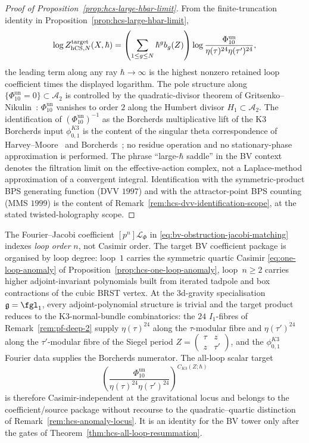 \begin{proof}[Proof of Proposition~\ref{prop:hcs-large-hbar-limit}]
From the finite-truncation identity in
Proposition~\ref{prop:hcs-large-hbar-limit},
\[
\log Z_{\mathrm{hCS},N}^{\mathrm{target}}(X,\hbar)
=
\left(\sum_{1\leq g\leq N}\hbar^g b_g(Z)\right)
\log\frac{\Phi_{10}^{\mathrm{un}}}
{\eta(\tau)^{24}\eta(\tau')^{24}},
\]
the leading term along any ray \(\hbar\to\infty\) is the highest
nonzero retained loop coefficient times the displayed logarithm. The
pole structure along $\{\Phi_{10}^{\mathrm{un}}=0\}\subset
\mathcal{A}_2$ is controlled by the quadratic-divisor theorem of
Gritsenko--Nikulin~\cite{GritsenkoNikulin1998}:
$\Phi_{10}^{\mathrm{un}}$ vanishes to order $2$ along the Humbert divisor
$H_{1}\subset\mathcal A_{2}$.
The identification of $(\Phi_{10}^{\mathrm{un}})^{-1}$ as the Borcherds multiplicative
lift of the K3 Borcherds input \(\phi_{0,1}^{K3}\) is
the content of the singular theta correspondence of
Harvey--Moore~\cite{HarveyMoore1996} and
Borcherds~\cite{Borcherds1998}; no residue operation and no
stationary-phase approximation is performed. The phrase
``large-$\hbar$ saddle'' in the BV context denotes the filtration
limit on the effective-action complex, not a Laplace-method
approximation of a convergent integral. Identification with the
symmetric-product BPS generating function (DVV $1997$) and with the
attractor-point BPS counting (MMS $1999$) is the content of
Remark~\ref{rem:hcs-dvv-identification-scope}, at the stated
twisted-holography scope.
\end{proof}

\begin{remark}
\label{rem:hcs-loop-vs-casimir}
The Fourier--Jacobi coefficient \([p^n]\mathcal L_{\Phi}\) in
\eqref{eq:bv-obstruction-jacobi-matching} indexes
\emph{loop order} $n$, not Casimir order. The target BV coefficient
package is organised by loop degree: loop~$1$ carries the symmetric
quartic Casimir \eqref{eq:one-loop-anomaly} of
Proposition~\ref{prop:hcs-one-loop-anomaly}, loop~$n \geq 2$ carries
higher adjoint-invariant polynomials built from iterated tadpole and
box contractions of the cubic BRST vertex. At the 3d-gravity specialisation
$\fg = \fgl_{1}$, every adjoint-polynomial structure is trivial and
the target product reduces to the K3-normal-bundle combinatorics: the
$24$ $I_{1}$-fibres of Remark~\ref{rem:pf-deep-2} supply
$\eta(\tau)^{24}$ along the $\tau$-modular fibre and $\eta(\tau')^{24}$
along the $\tau'$-modular fibre of the Siegel period
$Z=\begin{pmatrix}\tau&z\\z&\tau'\end{pmatrix}$, and the
$\phi_{0,1}^{K3}$ Fourier data supplies the Borcherds numerator.
The all-loop scalar target
\[
\left(\frac{\Phi_{10}^{\mathrm{un}}}
{\eta(\tau)^{24}\eta(\tau')^{24}}\right)^{C_{K3}(Z;\hbar)}
\]
is therefore Casimir-independent at the gravitational locus and
belongs to the coefficient/source package without recourse to the
quadratic--quartic distinction of
Remark~\ref{rem:hcs-anomaly-locus}.  It is an identity for the BV tower
only after the gates of Theorem~\ref{thm:hcs-all-loop-resummation}.
\end{remark}


